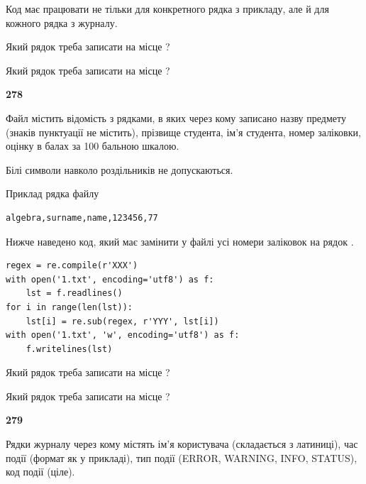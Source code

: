 Код має працювати не тільки для конкретного рядка з прикладу, але й для кожного рядка з журналу.




Який рядок треба записати на місце  ?\par
\vspace{5mm}


Який рядок треба записати на місце  ?\par


\newpage

{\begin {center}\textbf{ 278}\end {center}}\par
Файл  містить відомість з рядками, в яких через кому записа\-но назву предмету (знаків пунктуації не містить), прізвище студента, ім'я студента, номер залі\-ков\-ки, оцінку в балах за 100 бальною шкалою.

Білі символи навколо роздільників не допускаються.

Приклад рядка файлу



\begin{verbatim}
algebra,surname,name,123456,77
\end{verbatim}


Нижче наведено код, який має замінити у файлі усі номери заліковок на рядок \code{***}.



\begin{verbatim}
regex = re.compile(r'XXX')
with open('1.txt', encoding='utf8') as f:
    lst = f.readlines()
for i in range(len(lst)):
    lst[i] = re.sub(regex, r'YYY', lst[i])
with open('1.txt', 'w', encoding='utf8') as f:
    f.writelines(lst)
\end{verbatim}







Який рядок треба записати на місце  ?\par
\vspace{5mm}


Який рядок треба записати на місце  ?\par


\newpage

{\begin {center}\textbf{ 279}\end {center}}\par
Рядки журналу через кому містять ім'я користувача (складається з латиниці), час події (фор\-мат як у прикладі), тип події (ERROR, WARNING, INFO, STATUS), код події (ціле).

